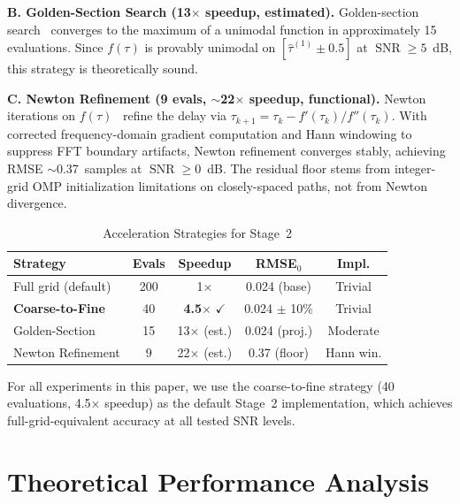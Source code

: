 \documentclass[a4paper,fleqn]{cas-dc}
\DeclareMathOperator{\SNR}{SNR}
\begin{document}
\textbf{B. Golden-Section Search (13$\times$ speedup, estimated).} Golden-section search~\cite{kiefer1953} converges to the maximum of a unimodal function in approximately 15 evaluations. Since $f(\tau)$ is provably unimodal on $[\hat{\tau}^{(1)} \pm 0.5]$ at $\SNR \ge 5$~dB, this strategy is theoretically sound.

\textbf{C. Newton Refinement (9 evals, $\sim$22$\times$ speedup, functional).} Newton iterations on $f(\tau)$~\cite{mamandipoor2016} refine the delay via $\tau_{k+1}=\tau_k - f'(\tau_k)/f''(\tau_k)$. With corrected frequency-domain gradient computation and Hann windowing to suppress FFT boundary artifacts, Newton refinement converges stably, achieving RMSE $\sim$0.37~samples at $\SNR\ge 0$~dB. The residual floor stems from integer-grid OMP initialization limitations on closely-spaced paths, not from Newton divergence.

\begin{table}[width=.9\linewidth,cols=5,pos=h]
\centering
\caption{Acceleration Strategies for Stage~2}
\label{tab:accel}
\footnotesize
\begin{tabular}{@{}lcccc@{}}
\toprule
Strategy & Evals & Speedup & RMSE$_0$ & Impl. \\
\midrule
Full grid (default) & 200 & 1$\times$ & 0.024 (base) & Trivial \\
\textbf{Coarse-to-Fine} & 40 & \textbf{4.5}$\times$ $\checkmark$ & 0.024 $\pm$ 10\% & Trivial \\
Golden-Section & 15 & 13$\times$ (est.) & 0.024 (proj.) & Moderate \\
Newton Refinement & 9 & 22$\times$ (est.) & 0.37 (floor) & Hann win. \\
\bottomrule
\end{tabular}
\end{table}

For all experiments in this paper, we use the coarse-to-fine strategy (40 evaluations, 4.5$\times$ speedup) as the default Stage~2 implementation, which achieves full-grid-equivalent accuracy at all tested SNR levels.

\section{Theoretical Performance Analysis}
\label{sec:theory}
\end{document}
